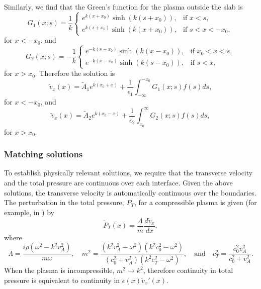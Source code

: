 \documentclass{aastex61}
\begin{document}
Similarly, we find that the Green's function for the plasma outside the slab is 
\begin{equation}
G_1(x;s) = \frac{1}{k}
\begin{cases}
e^{k(x + x_0)}\sinh(k(s + x_0)), & \text{if } x < s, \\
e^{k(s + x_0)}\sinh(k(x + x_0)), & \text{if } s < x < -x_0,
\end{cases}
\end{equation}
for $x < -x_0$, and
\begin{equation}
G_2(x;s) = -\frac{1}{k}
\begin{cases}
e^{-k(s - x_0)}\sinh(k(x - x_0)), & \text{if } x_0 < x < s, \\
e^{-k(x - x_0)}\sinh(k(s - x_0)), & \text{if } s < x,
\end{cases}
\end{equation}
for $x > x_0$. Therefore the solution is
\begin{equation}
\tilde{v}_x(x) = \tilde{A}_1e^{k(x_0 + x)} + \frac{1}{\epsilon_1}\int_{-\infty}^{-x_0} G_1(x;s) f(s) ds,
\end{equation}
for $x < -x_0$, and
\begin{equation}
\tilde{v}_x(x) = \tilde{A}_2e^{k(x_0 - x)} + \frac{1}{\epsilon_2}\int_{x_0}^{\infty} G_2(x;s) f(s) ds,
\end{equation}
for $x > x_0$.


\subsubsection{Matching solutions}
To establish physically relevant solutions, we require that the transverse velocity and the total pressure are continuous over each interface. Given the above solutions, the transverse velocity is automatically continuous over the boundaries. The perturbation in the total pressure, $P_T$, for a compressible plasma is given (for example, in \cite{all_etal17}) by
\begin{equation}
\tilde{P}_T(x) = \frac{\Lambda}{m}\frac{d\tilde{v}_x}{d x},
\end{equation}
where
\begin{equation}
\Lambda = \frac{i\rho(\omega^2 - k^2v_A^2)}{m\omega},
\quad
m^2 = \frac{(k^2v_A^2 - \omega^2)(k^2c_0^2 - \omega^2)}{(c_0^2 + v_A^2)(k^2c_T^2 - \omega^2)},
\quad \text{and} \quad
c_T^2 = \frac{c_0^2 v_A^2}{c_0^2 + v_A^2}.
\end{equation}
When the plasma is incompressible, $m^2 \to k^2$, therefore continuity in total pressure is equivalent to continuity in $\epsilon(x)\tilde{v}_x'(x)$.
\end{document}

